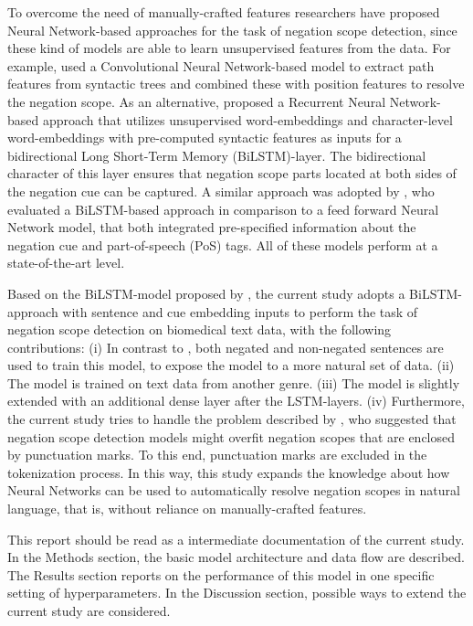 \documentclass{article}
\begin{document}
\begin{multicols}{2}
To overcome the need of manually-crafted features researchers have proposed Neural Network-based approaches for the task of negation scope detection, since these kind of models are able to learn unsupervised features from the data. For example, \cite{qian-2016} used a Convolutional Neural Network-based model to extract path features from syntactic trees and combined these with position features to resolve the negation scope. As an alternative, \cite{sergeeva2019} proposed a Recurrent Neural Network-based approach that utilizes unsupervised word-embeddings and character-level word-embeddings with pre-computed syntactic features as inputs for a bidirectional Long Short-Term Memory (BiLSTM)-layer. The bidirectional character of this layer ensures that negation scope parts located at both sides of the negation cue can be captured. A similar approach was adopted by \cite{fancellu2016neural}, who evaluated a BiLSTM-based approach in comparison to a feed forward Neural Network model, that both integrated pre-specified information about the negation cue and part-of-speech (PoS) tags. All of these models perform at a state-of-the-art level.

Based on the BiLSTM-model proposed by \cite{fancellu2016neural}, the current study adopts a BiLSTM-approach with sentence and cue embedding inputs to perform the task of negation scope detection on biomedical text data, with the following contributions: (i) In contrast to \cite{fancellu2016neural}, both negated and non-negated sentences are used to train this model, to expose the model to a more natural set of data. (ii) The model is trained on text data from another genre. (iii) The model is slightly extended with an additional dense layer after the LSTM-layers. (iv) Furthermore, the current study tries to handle the problem described by \cite{fancellu2017detecting}, who suggested that negation scope detection models might overfit negation scopes that are enclosed by punctuation marks. To this end, punctuation marks are excluded in the tokenization process. In this way, this study expands the knowledge about how Neural Networks can be used to automatically resolve negation scopes in natural language, that is, without reliance on manually-crafted features.

This report should be read as a intermediate documentation of the current study. In the Methods section, the basic model architecture and data flow are described. The Results section reports on the performance of this model in one specific setting of hyperparameters. In the Discussion section, possible ways to extend the current study are considered.


\end{multicols}
\end{document}
